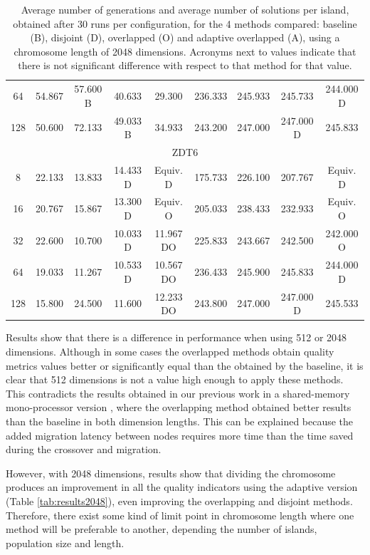\documentclass[Afour,sageh,times]{sagej}
\begin{document}
\begin{table}
{\begin{tabular}{|c||c|c|c|c||c|c|c|c||}
64	&	54.867		&	57.600	B	&	40.633			&	29.300			&	236.333		&	245.933			&	245.733			&	244.000	D			\\
128	&	50.600		&	72.133		&	49.033	B		&	34.933			&	243.200		&	247.000			&	247.000	D		&	245.833				\\ \hline
\multicolumn{9}{|c|}{ZDT6}																															\\ \hline
8	&	22.133		&	13.833		&	14.433	D		&	Equiv. D			&	175.733		&	226.100			&	207.767			&	Equiv. D				\\
16	&	20.767		&	15.867		&	13.300	D		&	Equiv. O			&	205.033		&	238.433			&	232.933			&	Equiv. O				\\
32	&	22.600		&	10.700		&	10.033	D		&	11.967	DO		&	225.833		&	243.667			&	242.500			&	242.000	O			\\
64	&	19.033		&	11.267		&	10.533	D		&	10.567	DO		&	236.433		&	245.900			&	245.833			&	244.000	D			\\
128	&	15.800		&	24.500		&	11.600			&	12.233	DO		&	243.800		&	247.000			&	247.000	D		&	245.533				\\ \hline
\end{tabular}
}
\caption{Average number of generations and average number of solutions per island, obtained after 30 runs per configuration, for the 4 methods compared: baseline (B), disjoint (D), overlapped (O) and adaptive overlapped (A), using a chromosome length of 2048 dimensions. Acronyms next to values indicate that there is not significant difference with respect to that method for that value.}
\label{tab:sols2048}
\end{table}

Results show that there is a difference in performance when using 512 or 2048 dimensions. Although in some cases the overlapped methods obtain quality metrics values better or significantly equal than the obtained by the baseline, it is clear that 512 dimensions is not a value high enough to apply these methods. This contradicts the results obtained in our previous work in a shared-memory mono-processor version \citep{Garcia16hpmoon}, where the overlapping method obtained better results than the baseline in both dimension lengths. This can be explained because the added migration latency between nodes requires more time than the time saved during the crossover and migration.

However, with 2048 dimensions, results show that dividing the chromosome produces an improvement in all the quality indicators using the adaptive version (Table \ref{tab:results2048}), even improving the overlapping and disjoint methods. Therefore, there exist some kind of limit point in chromosome length where one method will be preferable to another, depending the number of islands, population size and length.
\end{document}
